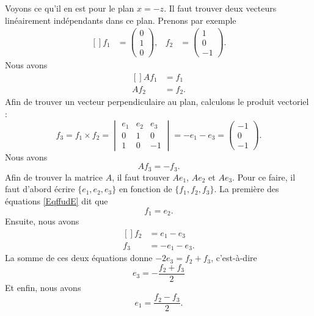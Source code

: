 Voyons ce qu'il en est pour le plan $x=-z$. Il faut trouver deux vecteurs linéairement indépendants dans ce plan. Prenons par exemple
\begin{equation}		\label{EqffudE}
	\begin{aligned}[]
		f_1&=\begin{pmatrix}
			0	\\
			1	\\
			0
		\end{pmatrix},&f_2&=\begin{pmatrix}
			1	\\
			0	\\
			-1
		\end{pmatrix}.
	\end{aligned}
\end{equation}
Nous avons
\begin{equation}
	\begin{aligned}[]
		Af_1&=f_1\\
		Af_2&=f_2.
	\end{aligned}
\end{equation}
Afin de trouver un vecteur perpendiculaire au plan, calculons le produit vectoriel :
\begin{equation}
	f_3=f_1\times f_2=\begin{vmatrix}
		e_1	&	e_2	&	e_3	\\
		0	&	1	&	0	\\
		1	&	0	&	-1
	\end{vmatrix}=-e_1-e_3=\begin{pmatrix}
		-1	\\
		0	\\
		-1
	\end{pmatrix}.
\end{equation}
Nous avons
\begin{equation}
	Af_3=-f_3.
\end{equation}
Afin de trouver la matrice $A$, il faut trouver $Ae_1$, $Ae_2$ et $Ae_3$. Pour ce faire, il faut d'abord écrire $\{ e_1,e_2,e_3 \}$ en fonction de $\{ f_1,f_2,f_3 \}$. La première des équations \eqref{EqffudE} dit que
\begin{equation}
	f_1=e_2.
\end{equation}
Ensuite, nous avons
\begin{equation}
	\begin{aligned}[]
		f_2&=e_1-e_3\\
		f_3&=-e_1-e_3.
	\end{aligned}
\end{equation}
La somme de ces deux équations donne $-2e_3=f_2+f_3$, c'est-à-dire
\begin{equation}
	e_3=-\frac{ f_2+f_3 }{ 2 }
\end{equation}
Et enfin, nous avons
\begin{equation}
	e_1=\frac{ f_2-f_3 }{ 2 }.
\end{equation}

